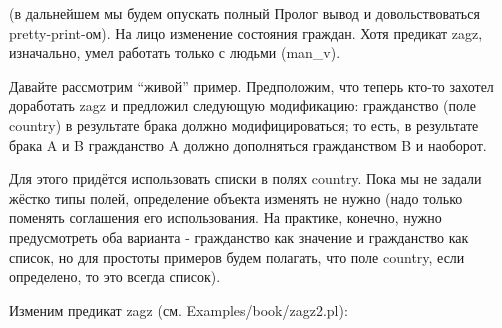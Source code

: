 \documentclass[a4paper]{book}
\begin{document}
(в дальнейшем мы будем опускать полный Пролог вывод и
довольствоваться pretty-print-ом). На лицо изменение состояния
граждан. Хотя предикат zagz, изначально, умел работать только с
людьми (man_v).

Давайте рассмотрим ``живой'' пример. Предположим, что теперь
кто-то захотел доработать zagz и предложил следующую модификацию:
гражданство (поле country) в результате брака должно
модифицироваться; то есть, в результате брака A и B гражданство
A должно дополняться гражданством B и наоборот.

Для этого придётся использовать списки в полях country. Пока мы
не задали жёстко типы полей, определение объекта изменять не
нужно (надо только поменять соглашения его использования. На
практике, конечно, нужно предусмотреть оба варианта - гражданство
как значение и гражданство как список, но для простоты примеров
будем полагать, что поле country, если определено, то это всегда
список).

Изменим предикат zagz (см. Examples/book/zagz2.pl):
\end{document}
